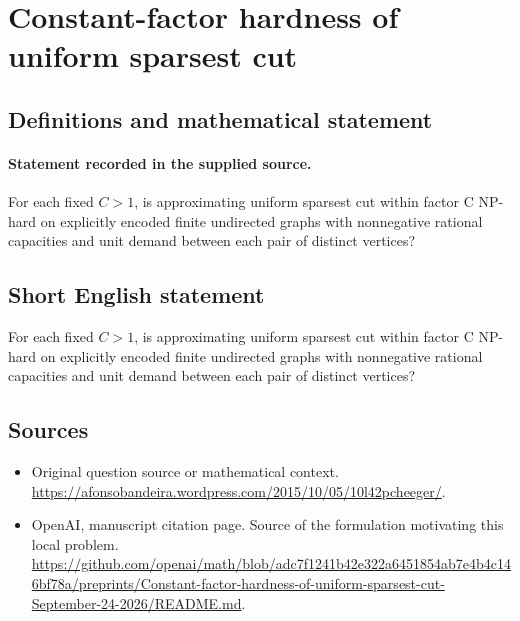 \documentclass[11pt]{article}
\begin{document}
\section*{Constant-factor hardness of uniform sparsest cut}\label{30007492}
\subsection{Definitions and mathematical statement}
\paragraph{Statement recorded in the supplied source.}
For each fixed $C>1$, is approximating uniform sparsest cut within factor C NP-hard on explicitly encoded finite undirected graphs with nonnegative rational capacities and unit demand between each pair of distinct vertices?
\subsection{Short English statement}
For each fixed $C>1$, is approximating uniform sparsest cut within factor C NP-hard on explicitly encoded finite undirected graphs with nonnegative rational capacities and unit demand between each pair of distinct vertices?
\subsection{Sources}
\begin{itemize}
\item[S1] Original question source or mathematical context.
\url{https://afonsobandeira.wordpress.com/2015/10/05/10l42pcheeger/}.
\item[S2] OpenAI, manuscript citation page. Source of the formulation motivating this local problem.
\url{https://github.com/openai/math/blob/adc7f1241b42e322a6451854ab7e4b4c146bf78a/preprints/Constant-factor-hardness-of-uniform-sparsest-cut-September-24-2026/README.md}.
\end{itemize}
\end{document}
